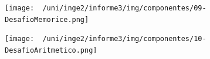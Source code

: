 \begin{figure}[H]
	\centering
	\texttt{[image: ~/uni/inge2/informe3/img/componentes/09-DesafioMemorice.png]}
	\caption{}
        \vspace{5pt}
	\label{fig:}
\end{figure}

\begin{figure}[H]
	\centering
	\texttt{[image: ~/uni/inge2/informe3/img/componentes/10-DesafioAritmetico.png]}
	\caption{}
        \vspace{5pt}
	\label{fig:}
\end{figure}

